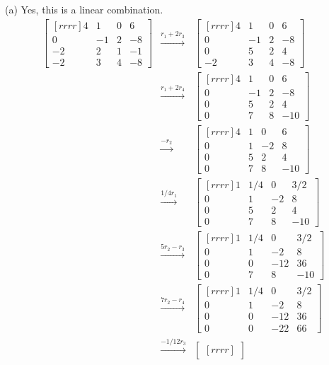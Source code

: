\begin{solution}
\noindent (a) Yes, this is a linear combination.
\begin{eqnarray*}
\begin{bmatrix}[rrrr]
4&1&0&6\\
0&-1&2&-8\\
-2&2&1&-1\\
-2&3&4&-8
\end{bmatrix}
&\xrightarrow[]{r_1 + 2r_3}&
\begin{bmatrix}[rrrr]
4&1&0&6\\
0&-1&2&-8\\
0&5&2&4\\
-2&3&4&-8
\end{bmatrix}\\
&\xrightarrow[]{r_1 + 2r_4}&
\begin{bmatrix}[rrrr]
4&1&0&6\\
0&-1&2&-8\\
0&5&2&4\\
0&7&8&-10
\end{bmatrix}\\
&\xrightarrow[]{-r_2}&
\begin{bmatrix}[rrrr]
4&1&0&6\\
0&1&-2&8\\
0&5&2&4\\
0&7&8&-10
\end{bmatrix}\\
&\xrightarrow[]{1/4r_1}&
\begin{bmatrix}[rrrr]
1&1/4&0&3/2\\
0&1&-2&8\\
0&5&2&4\\
0&7&8&-10
\end{bmatrix}\\
&\xrightarrow[]{5r_2-r_3}&
\begin{bmatrix}[rrrr]
1&1/4&0&3/2\\
0&1&-2&8\\
0&0&-12&36\\
0&7&8&-10
\end{bmatrix}\\
&\xrightarrow[]{7r_2-r_4}&
\begin{bmatrix}[rrrr]
1&1/4&0&3/2\\
0&1&-2&8\\
0&0&-12&36\\
0&0&-22&66
\end{bmatrix}\\
&\xrightarrow[]{-1/12r_3}&
\begin{bmatrix}[rrrr]

\end{bmatrix}
\end{eqnarray*}
\end{solution}
